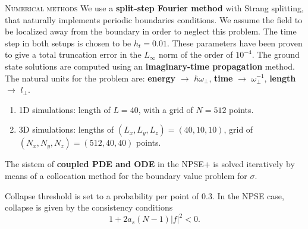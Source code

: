 \documentclass[final]{beamer}
\newlength{\colwidth}
\begin{document}
\begin{frame}[t]
\begin{columns}[t]
\begin{column}{\colwidth}
      \begin{block}{\textsc{Numerical methods}}
        We use a \textbf{split-step Fourier method} with Strang splitting, that naturally implements periodic boundaries conditions. We assume the field to be localized away from the boundary in order to neglect this problem. The time step in both setups is chosen to be $h_t = 0.01$. These parameters have been proven to give a total truncation error in the $L_\infty$ norm of the order of $10^{-4}$.
        The ground state solutions are computed using an \textbf{imaginary-time propagation} method. 
        The natural units for the problem are: \textbf{energy} $\longrightarrow$ $\hbar\omega_\perp$, \textbf{time}  $\rightarrow$ $\omega_\perp^{-1}$, \textbf{length} $\longrightarrow$ $l_\perp$.
        \begin{enumerate}
            \item 1D simulations: length of $L = 40$, with a grid of $N = 512$ points.
            \item  3D simulations: lengths of $(L_x, L_y, L_z) = (40, 10, 10)$, grid of $(N_x, N_y, N_z) = (512, 40, 40)$ points.
        \end{enumerate}
        The sistem of \textbf{coupled PDE and ODE} in the NPSE+ is solved iteratively by means of a collocation method for the boundary value problem for $\sigma$.

        Collapse threshold is set to a probability per point of $0.3$. In the NPSE case, collapse is given by the consistency conditions
        \begin{equation}
          1+2a_s(N-1)|f|^2 < 0 .
        \end{equation}
        
      \end{block}


\end{column}
\end{columns}
\end{frame}
\end{document}
